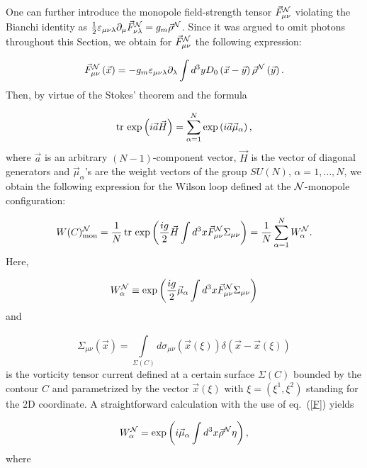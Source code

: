 \documentclass[a4paper,12pt]{article}
\begin{document}
One can further introduce
the monopole field-strength tensor $\vec F_{\mu\nu}^{\cal N}$ violating the Bianchi identity as $\frac12\varepsilon_{\mu\nu\lambda}
\partial_\mu\vec F_{\nu\lambda}^{\cal N}=g_m\vec\rho^{\cal N}$. Since it was argued to omit photons throughout this Section, we obtain
for $\vec F_{\mu\nu}^{\cal N}$ the following expression:

\begin{equation}
\label{F}
\vec F_{\mu\nu}^{\cal N}\left(\vec x\right)=-g_m\varepsilon_{\mu\nu\lambda}\partial_\lambda\int d^3y D_0\left(\vec x-\vec y\right)
\vec\rho^{\cal N}\left(\vec y\right).
\end{equation}
Then, by virtue of the Stokes' theorem and the formula

$${\rm tr}{\,}\exp\left(i\vec a\vec H\right)=
\sum\limits_{\alpha=1}^{N}\exp\left(i\vec a\vec\mu_\alpha\right),$$
where $\vec a$ is an arbitrary $(N-1)$-component vector, $\vec H$ is the vector of diagonal generators
and $\vec\mu_{\alpha}$'s are the weight vectors of the group $SU(N)$, $\alpha=1,\ldots, N$, we obtain the following expression
for the Wilson loop defined at the ${\cal N}$-monopole configuration:

\begin{equation}
\label{WcalN}
W(C)_{\rm mon}^{\cal N}=\frac{1}{N}{\,}{\rm tr}{\,}\exp\left(\frac{ig}{2}\vec H\int d^3x\vec F_{\mu\nu}^{\cal N}\Sigma_{\mu\nu}\right)=
\frac{1}{N}\sum\limits_{\alpha=1}^{N}W_\alpha^{\cal N}.
\end{equation}
Here,

\begin{equation}
\label{Wa}
W_\alpha^{\cal N}\equiv\exp\left(\frac{ig}{2}\vec\mu_\alpha\int d^3x\vec F_{\mu\nu}^{\cal N}\Sigma_{\mu\nu}\right)
\end{equation}
and

$$\Sigma_{\mu\nu}\left(\vec x\right)=\int\limits_{\Sigma(C)}^{}
d\sigma_{\mu\nu}\left(\vec x\left(\xi\right)\right)\delta\left(\vec x-\vec x(\xi)\right)$$
is the vorticity tensor current defined at a certain surface
$\Sigma(C)$ bounded by the contour $C$ and parametrized by the vector
$\vec x(\xi)$ with $\xi=\left(\xi^1,\xi^2\right)$ standing for the 2D coordinate.
A straightforward calculation with the use of eq.~(\ref{F}) yields

\begin{equation}
\label{W}
W_\alpha^{\cal N}=\exp\left(i\vec\mu_\alpha\int d^3x\vec\rho^{\cal N}\eta\right),
\end{equation}
where
\end{document}
